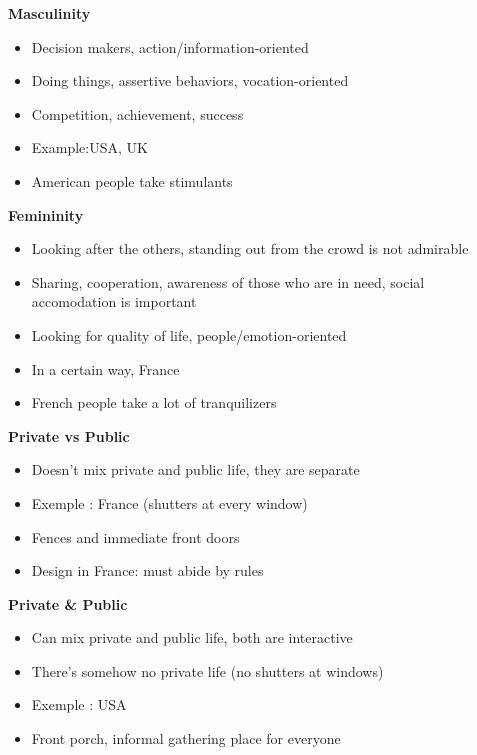 \documentclass[11pt,a4paper,oneside,french,svgnames]{report}
\begin{document}
\begin{center}
\begin{minipage}[t]{.49\textwidth}
\centering\textbf{Masculinity}\\
  \begin{itemize}
    \item Decision makers, action/information-oriented
    \item Doing things, assertive behaviors, vocation-oriented
    \item Competition, achievement, success
    \item Example:USA, UK
    \item American people take stimulants
  \end{itemize}
\end{minipage}
\begin{minipage}[t]{.49\textwidth}
\centering\textbf{Femininity}\\
  \begin{itemize}
    \item Looking after the others, standing out from the crowd is not admirable
    \item Sharing, cooperation, awareness of those who are in need, social accomodation is important
    \item Looking for quality of life, people/emotion-oriented
    \item In a certain way, France
    \item French people take a lot of tranquilizers
  \end{itemize}
\end{minipage}

\begin{minipage}[t]{.49\textwidth}
\centering\textbf{Private vs Public}\\
  \begin{itemize}
    \item Doesn't mix private and public life, they are separate
    \item Exemple : France (shutters at every window)
    \item Fences and immediate front doors
    \item Design in France: must abide by rules
  \end{itemize}
\end{minipage}
\begin{minipage}[t]{.49\textwidth}
\centering\textbf{Private \& Public}\\
  \begin{itemize}
    \item Can mix private and public life, both are interactive
    \item There's somehow no private life (no shutters at windows)
    \item Exemple : USA
    \item Front porch, informal gathering place for everyone
  \end{itemize}
\end{minipage}


\end{center}
\end{document}
